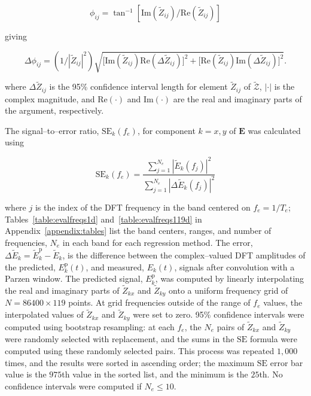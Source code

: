 \documentclass[draft,linenumbers]{agujournal2018}
\begin{document}
$$\phi_{ij}=\tan^{-1}[\text{Im}(\widetilde{Z}_{ij})/\text{Re}(\widetilde{Z}_{ij})]$$

\noindent giving

$$\Delta\phi_{ij} = (1/|\widetilde{Z}_{ij}|^2) \sqrt{ \big[\text{Im}(\widetilde{Z}_{ij})\text{Re}(\Delta \widetilde{Z}_{ij})\big]^2 + \big[\text{Re}(\widetilde{Z}_{ij})\text{Im}(\Delta \widetilde{Z}_{ij}) \big]^2}.$$

\noindent where $\Delta \widetilde{Z}_{ij}$ is the 95\% confidence interval length for element $\widetilde{Z}_{ij}$ of $\boldsymbol{\mathcal{\widetilde{Z}}}$, $|\boldsymbol{\cdotp}|$ is the complex magnitude, and $\text{Re}(\boldsymbol{\cdotp})$ and $\text{Im}(\boldsymbol{\cdotp})$ are the real and imaginary parts of the argument, respectively.


The signal--to--error ratio, $\text{SE}_k(f_e)$, for component $k=x,y$ of $\mathbf{E}$ was calculated using 

\begin{equation}
\text{SE}_k(f_e) = \frac{\displaystyle\sum_{j=1}^{N_e} \left|\widetilde{E}_k(f_j)\right|^2}{\displaystyle\sum_{j=1}^{N_e}\left|\Delta\widetilde{E}_k(f_j)\right|^2}
\end{equation}

\noindent where $j$ is the index of the DFT frequency in the band centered on $f_e=1/T_e$; Tables~\ref{table:evalfreqs1d} and~\ref{table:evalfreqs119d} in Appendix~\ref{appendix:tables} list the band centers, ranges, and number of frequencies, $N_e$ in each band for each regression method. The error, $\Delta\widetilde{E}_k = \widetilde{E}_k^{\text{p}}-\widetilde{E}_k$, is the difference between the complex--valued DFT amplitudes of the predicted, $E_k^\text{p}(t)$, and measured, $E_k(t)$, signals after convolution with a Parzen window. The predicted signal, $E_k^{\text{p}}$, was computed by linearly interpolating the real and imaginary parts of $\widetilde{Z}_{kx}$ and $\widetilde{Z}_{ky}$ onto a uniform frequency grid of $N=86400\times 119$ points. At grid frequencies outside of the range of $f_e$ values, the interpolated values of $\widetilde{Z}_{kx}$ and $\widetilde{Z}_{ky}$ were set to zero. 95\% confidence intervals were computed using bootstrap resampling: at each $f_e$, the $N_e$ pairs of $\widetilde{Z}_{kx}$ and $\widetilde{Z}_{ky}$ were randomly selected with replacement, and the sums in the $\text{SE}$ formula were computed using these randomly selected pairs. This process was repeated $1,000$ times, and the results were sorted in ascending order; the maximum $\text{SE}$ error bar value is the $975$th value in the sorted list, and the minimum is the $25$th. No confidence intervals were computed if $N_e\le 10$.
\end{document}
